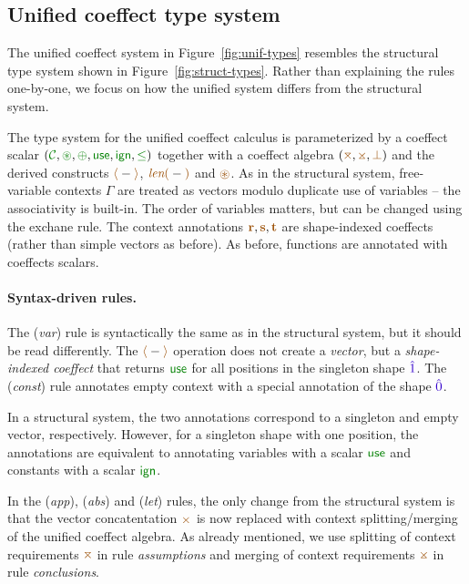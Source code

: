 \subsection{Unified coeffect type system}
\label{sec:unified-types}
The unified coeffect system in Figure~\ref{fig:unif-types} resembles the structural type system
shown in Figure~\ref{fig:struct-types}. Rather than explaining the rules one-by-one, we focus on
how the unified system differs from the structural system.

The type system for the unified coeffect calculus is parameterized by a coeffect scalar 
$(\C, \cseq, \cpar, \cunit, \czero, \cleq)$ together with a coeffect algebra $(\azip, \apar, \azero)$ 
and the derived constructs $\alift{-}$, $\alen{-}$ and $\aseq$. 
As in the structural system, free-variable contexts $\Gamma$ are treated as vectors modulo duplicate
use of variables -- the associativity is built-in. The order of variables matters, but can be changed 
using the exchane rule. The context annotations $\aclrd{\textbf{r}}, \aclrd{\textbf{s}}, \aclrd{\textbf{t}}$ 
are shape-indexed coeffects (rather than simple vectors as before). As before, functions are
annotated with coeffects scalars.

\paragraph{Syntax-driven rules.} 
The (\emph{var}) rule is syntactically the same as in the structural system, but it should be read
differently. The $\alift{-}$ operation does not create a \emph{vector}, but a \emph{shape-indexed
coeffect} that returns $\cunit$ for all positions in the singleton shape $\sunit$. 
The (\emph{const}) rule annotates empty context with a special annotation of the shape $\sempty$.

In a structural system, the two annotations correspond to a singleton and empty vector, respectively.
However, for a singleton shape with one position, the annotations are equivalent to annotating
variables with a scalar $\cunit$ and constants with a scalar $\czero$.

In the (\emph{app}), (\emph{abs}) and (\emph{let}) rules, the only change from the structural
system is that the vector concatentation $\atimes$ is now replaced with context splitting/merging 
of the unified coeffect algebra. As already mentioned, we use splitting of context requirements $\azip$
in rule \emph{assumptions} and merging of context requirements $\apar$ in rule \emph{conclusions}.

